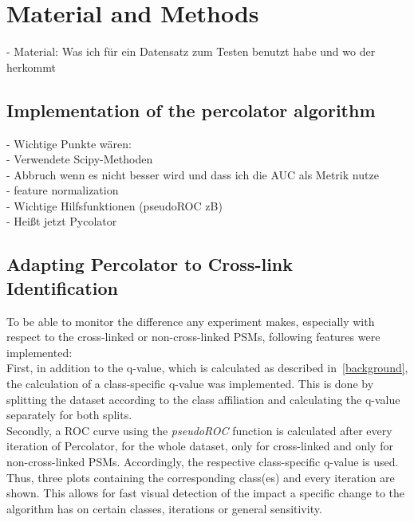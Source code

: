 
\chapter{Material and Methods}
\label{matmet}

- Material: Was ich für ein Datensatz zum Testen benutzt habe und wo der herkommt
\label{lab:matmet:dataset}

\section{Implementation of the percolator algorithm}
- Wichtige Punkte wären:\\
- Verwendete Scipy-Methoden\\
- Abbruch wenn es nicht besser wird und dass ich die AUC als Metrik nutze\\
- \label{lab:matmet:normalization} feature normalization\\
- \label{lab:matmet:pseudoROC}Wichtige Hilfsfunktionen (pseudoROC zB)\\
- Heißt jetzt Pycolator

\section{Adapting Percolator to Cross-link Identification}
To be able to monitor the difference any experiment makes, especially with respect to the cross-linked or non-cross-linked PSMs, following features were implemented:\\
First, in addition to the q-value, which is calculated as described in~\ref{background}, the calculation of a class-specific q-value was implemented. This is done by splitting the dataset according to the class affiliation and calculating the q-value separately for both splits.\\
\label{lab:matmet:rocs_after_every_iteration}
Secondly, a ROC curve using the \emph{pseudoROC} function is calculated after every iteration of Percolator, for the whole dataset, only for cross-linked and only for non-cross-linked PSMs. Accordingly, the respective class-specific q-value is used. Thus, three plots containing the corresponding class(es) and every iteration are shown. This allows for fast visual detection of the impact a specific change to the algorithm has on certain classes, iterations or general sensitivity.
